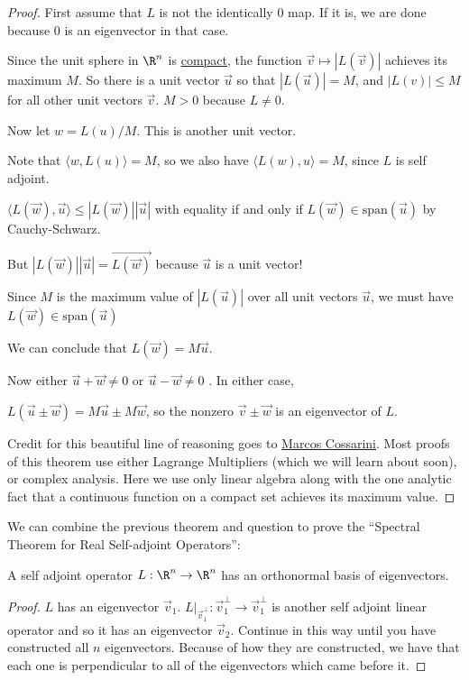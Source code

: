 \documentclass{ximera}
\begin{document}
\begin{proof}
	First assume that $L$ is not the identically $0$ map.  If it is, we are done because $0$ is an eigenvector in that case.
	
	Since the unit sphere in $\R^n$ is \href{http://en.wikipedia.org/wiki/Compact_space}{compact},
	 the function $\vec{v} \mapsto |L(\vec{v})|$ achieves its maximum $M$.  So there is a unit vector 
	$\vec{u}$ so that $|L(\vec{u})| = M$, and $|L(v)| \leq M$ for all other unit vectors $\vec{v}$.  $M > 0$ because $L \neq 0$.
	
	Now let $w = L(u)/M$.  This is another unit vector.
	
	Note that $\langle w, L(u)\rangle = M$, so we also have $\langle L(w), u \rangle = M$, since $L$ is self adjoint.
	
	$\langle L(\vec{w}),\vec{u}\rangle \leq |L(\vec{w})||\vec{u}|$ with equality if and only if $L(\vec{w}) \in \mathrm{span}(\vec{u})$ by Cauchy-Schwarz.
	
	But $|L(\vec{w})||\vec{u}| = \vec{L(\vec{w})}$ because $\vec{u}$ is a unit vector!
		
	Since $M$ is the maximum value of $|L(\vec{u})|$ over all unit vectors $\vec{u}$, we must have  $L(\vec{w}) \in \mathrm{span}(\vec{u})$
	
	We can conclude that $L(\vec{w}) = M\vec{u}$.
	
	Now either $\vec{u}+\vec{w} \neq 0$ or $\vec{u}-\vec{w} \neq 0$ .  In either case,
	
	$L(\vec{u} \pm \vec{w}) = M\vec{u} \pm M\vec{w}$, so the nonzero $\vec{v} \pm \vec{w}$ is an eigenvector of $L$.
	
	Credit for this beautiful line of reasoning goes to \href{http://mathoverflow.net/a/118759/1106}{Marcos Cossarini}.  Most proofs of this theorem use either 
	Lagrange Multipliers (which we will learn about soon), or complex analysis.  Here we use only linear algebra along with the one analytic fact that a continuous 
	function on a compact set achieves its maximum value.
\end{proof}

	We can combine the previous theorem and question to prove the ``Spectral Theorem for Real Self-adjoint Operators'':  
	
	\begin{theorem}
		A self adjoint operator $L : \R^n \to \R^n$ has an orthonormal basis of eigenvectors.
	\end{theorem}
	
\begin{proof}
	$L$ has an eigenvector $\vec{v}_1$.  $L\big|_{\vec{v}_1^\perp} : \vec{v}_1^\perp \to \vec{v}_1^\perp$  is another self adjoint linear operator and so it has an eigenvector $\vec{v}_2$.  
	Continue in this way until you have constructed all $n$ eigenvectors.  Because of how they are constructed, we have that each one is perpendicular to all of the 
	eigenvectors which came before it. 
\end{proof}
\end{document}
